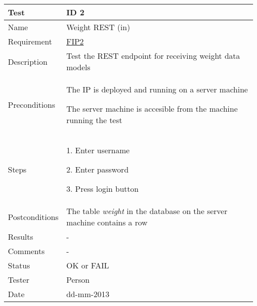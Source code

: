 \begin{table}
\begin{center}
\begin{tabular}{ | l | p{10cm} | }
	\hline
	\textbf{Test}	&	\textbf{ID 2} \\
	\hline\noalign{\smallskip}\noalign{\smallskip}\hline
	Name				& Weight REST (in) \\
	Requirement			& \hyperref[table:reqip]{FIP2} \\
	Description			& Test the REST endpoint for receiving weight data models \\
	Preconditions		&	\par The IP is deployed and running on a server machine
							\par The server machine is accesible from the machine running the test \\
	Steps 				&	\par 1. Enter username
							\par 2. Enter password
							\par 3. Press login button \\
	Postconditions		& The table \textit{weight} in the database on the server machine contains a row \\
	Results				& - \\
	Comments			& - \\
	Status				& OK or FAIL \\
	Tester				& Person \\
	Date				& dd-mm-2013 \\
	\hline
\end{tabular}
\end{center}
\end{table}

